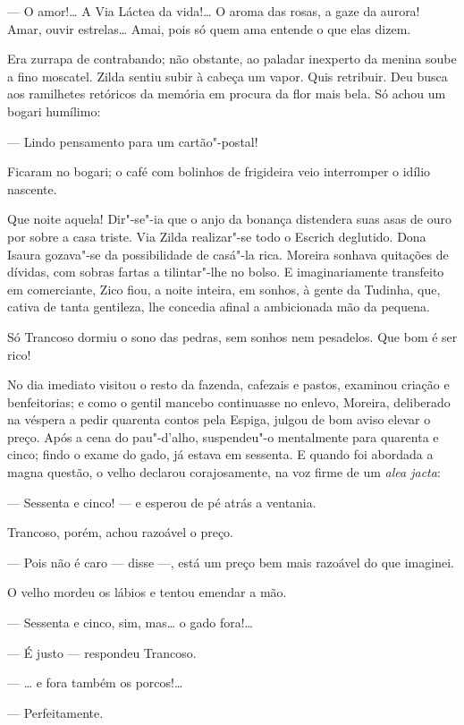 --- O amor!\ldots{} A Via Láctea da vida!\ldots{} O aroma das rosas, a gaze da
aurora! Amar, ouvir estrelas\ldots{} Amai, pois só quem ama entende o que
elas dizem.

Era zurrapa de contrabando; não obstante, ao paladar inexperto da menina
soube a fino moscatel. Zilda sentiu subir à cabeça um vapor. Quis
retribuir. Deu busca aos ramilhetes retóricos da memória em procura da
flor mais bela. Só achou um bogari humílimo:

--- Lindo pensamento para um cartão"-postal!

Ficaram no bogari; o café com bolinhos de frigideira veio interromper o
idílio nascente.

Que noite aquela! Dir"-se"-ia que o anjo da bonança distendera suas asas
de ouro por sobre a casa triste. Via Zilda realizar"-se todo o Escrich
deglutido. Dona Isaura gozava"-se da possibilidade de casá"-la rica.
Moreira sonhava quitações de dívidas, com sobras fartas a tilintar"-lhe
no bolso. E imaginariamente transfeito em comerciante, Zico fiou, a
noite inteira, em sonhos, à gente da Tudinha, que, cativa de tanta
gentileza, lhe concedia afinal a ambicionada mão da pequena.

Só Trancoso dormiu o sono das pedras, sem sonhos nem pesadelos. Que bom
é ser rico!

No dia imediato visitou o resto da fazenda, cafezais e pastos, examinou
criação e benfeitorias; e como o gentil mancebo continuasse no enlevo,
Moreira, deliberado na véspera a pedir quarenta contos pela Espiga,
julgou de bom aviso elevar o preço. Após a cena do pau"-d'alho,
suspendeu"-o mentalmente para quarenta e cinco; findo o exame do gado, já
estava em sessenta. E quando foi abordada a magna questão, o velho
declarou corajosamente, na voz firme de um \emph{alea jacta}:

--- Sessenta e cinco! --- e esperou de pé atrás a ventania.

Trancoso, porém, achou razoável o preço.

--- Pois não é caro --- disse ---, está um preço bem mais razoável do
que imaginei.

O velho mordeu os lábios e tentou emendar a mão.

--- Sessenta e cinco, sim, mas\ldots{} o gado fora!\ldots{}

--- É justo --- respondeu Trancoso.

--- \ldots{} e fora também os porcos!\ldots{}

--- Perfeitamente.

